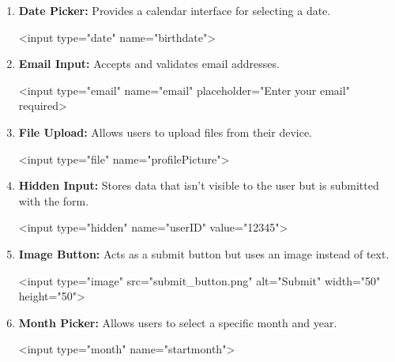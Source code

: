 \documentclass{report}
\begin{document}
\begin{enumerate}
            \item \textbf{Date Picker:} Provides a calendar interface for selecting a date.
                \bigbreak \noindent 
                \begin{htmlcode}
                    <input type="date" name="birthdate">
                \end{htmlcode}

            \item \textbf{Email Input:} Accepts and validates email addresses.
                \bigbreak \noindent 
                \begin{htmlcode}
                    <input type="email" name="email" placeholder="Enter your email" required>
                \end{htmlcode}
                
            \item \textbf{File Upload:} Allows users to upload files from their device.
                \bigbreak \noindent 
                \begin{htmlcode}
                    <input type="file" name="profilePicture">
                \end{htmlcode}

            \item \textbf{Hidden Input:} Stores data that isn’t visible to the user but is submitted with the form.
                \bigbreak \noindent 
                \begin{htmlcode}
                    <input type="hidden" name="userID" value="12345">
                \end{htmlcode}
                
            \item \textbf{Image Button:} Acts as a submit button but uses an image instead of text.
                \bigbreak \noindent 
                \begin{htmlcode}
                    <input type="image" src="submit_button.png" alt="Submit" width="50" height="50">
                \end{htmlcode}
                
            \item \textbf{Month Picker:} Allows users to select a specific month and year.
                \bigbreak \noindent 
                \begin{htmlcode}
                    <input type="month" name="startmonth">
                \end{htmlcode}
                

\end{enumerate}
\end{document}
